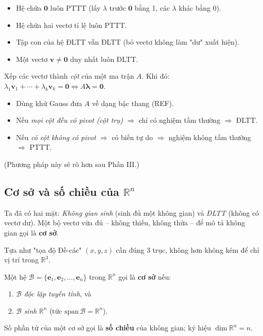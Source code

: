 \documentclass[12pt,a4paper]{article}
\begin{document}
\begin{tinhchat}[title={Các quan sát hữu dụng}]
\begin{itemize}
  \item Hệ chứa $\mathbf{0}$ luôn PTTT (lấy $\lambda$ trước $\mathbf{0}$ bằng 1, các $\lambda$ khác bằng 0).
  \item Hệ chứa hai vectơ tỉ lệ luôn PTTT.
  \item Tập con của hệ ĐLTT vẫn ĐLTT (bỏ vectơ không làm "dư" xuất hiện).
  \item Một vectơ $\mathbf{v} \ne \mathbf{0}$ duy nhất luôn ĐLTT.
\end{itemize}
\end{tinhchat}

\begin{phuongphap}[title={Cách kiểm tra ĐLTT thực hành}]
Xếp các vectơ thành \emph{cột} của một ma trận $A$. Khi đó: $\lambda_1\mathbf{v}_1 + \cdots + \lambda_k\mathbf{v}_k = \mathbf{0} \Leftrightarrow A\boldsymbol{\lambda} = \mathbf{0}$.
\begin{itemize}
  \item Dùng khử Gauss đưa $A$ về dạng bậc thang (REF).
  \item Nếu \emph{mọi cột đều có pivot (cột trụ)} $\Rightarrow$ chỉ có nghiệm tầm thường $\Rightarrow$ ĐLTT.
  \item Nếu \emph{có cột không có pivot} $\Rightarrow$ có biến tự do $\Rightarrow$ nghiệm không tầm thường $\Rightarrow$ PTTT.
\end{itemize}
(Phương pháp này sẽ rõ hơn sau Phần III.)
\end{phuongphap}

\subsection{Cơ sở và số chiều của $\mathbb{R}^n$}

\begin{dongco}
Ta đã có hai mặt: \emph{Không gian sinh} (sinh đủ một không gian) và \emph{ĐLTT} (không có vectơ dư). Một bộ vectơ vừa đủ -- không thiếu, không thừa -- để mô tả không gian gọi là \textbf{cơ sở}.

Tựa như "tọa độ Đề-các" $(x, y, z)$ cần đúng 3 trục, không hơn không kém để chỉ vị trí trong $\mathbb{R}^3$.
\end{dongco}

\begin{dinhnghia}
  Một hệ $\mathcal{B} = \{\mathbf{e}_1, \mathbf{e}_2, \ldots, \mathbf{e}_n\}$ trong $\mathbb{R}^n$ gọi là \textbf{cơ sở} nếu:
  \begin{enumerate}
    \item $\mathcal{B}$ \emph{độc lập tuyến tính}, và
    \item $\mathcal{B}$ \emph{sinh} $\mathbb{R}^n$ (tức $\mathrm{span}\,\mathcal{B} = \mathbb{R}^n$).
  \end{enumerate}
  Số phần tử của một cơ sở gọi là \textbf{số chiều} của không gian; ký hiệu $\dim \mathbb{R}^n = n$.
\end{dinhnghia}
\end{document}
